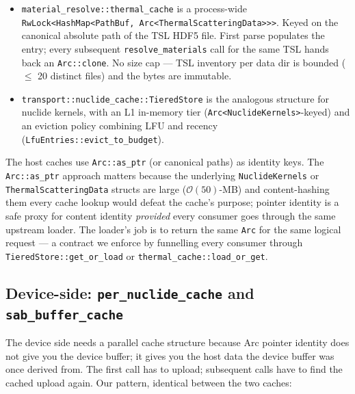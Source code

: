 \begin{itemize}
    \item \texttt{material\_resolve::thermal\_cache} is a
        process-wide \texttt{RwLock<HashMap<PathBuf,
        Arc<ThermalScatteringData>>>}. Keyed on the canonical
        absolute path of the TSL HDF5 file. First parse populates
        the entry; every subsequent \texttt{resolve\_materials} call
        for the same TSL hands back an \texttt{Arc::clone}. No
        size cap --- TSL inventory per data dir is bounded
        ($\leq$ 20 distinct files) and the bytes are immutable.
    \item \texttt{transport::nuclide\_cache::TieredStore} is the
        analogous structure for nuclide kernels, with an L1
        in-memory tier (\texttt{Arc<NuclideKernels>}-keyed) and an
        eviction policy combining LFU and recency
        (\texttt{LfuEntries::evict\_to\_budget}).
\end{itemize}

The host caches use \texttt{Arc::as\_ptr} (or canonical paths) as
identity keys. The \texttt{Arc::as\_ptr} approach matters because
the underlying \texttt{NuclideKernels} or
\texttt{ThermalScatteringData} structs are large
($\mathcal{O}(50)$-MB) and content-hashing them every cache lookup
would defeat the cache's purpose; pointer identity is a safe proxy
for content identity \emph{provided} every consumer goes through the
same upstream loader. The loader's job is to return the same
\texttt{Arc} for the same logical request --- a contract we enforce
by funnelling every consumer through \texttt{TieredStore::get\_or\_load}
or \texttt{thermal\_cache::load\_or\_get}.

\subsection{Device-side: \texttt{per\_nuclide\_cache} and \texttt{sab\_buffer\_cache}}

The device side needs a parallel cache structure because Arc
pointer identity does not give you the device buffer; it gives you
the host data the device buffer was once derived from. The first
call has to upload; subsequent calls have to find the cached upload
again. Our pattern, identical between the two caches:

